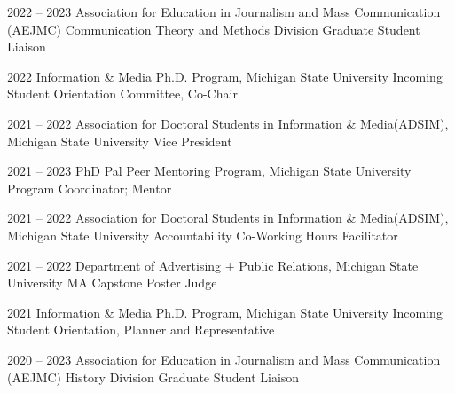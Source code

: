 \newpage
{}
\begin{cvskills}
    \cvskill
    {2022 -- 2023} %
    {Association for Education in Journalism and Mass Communication (AEJMC) Communication Theory and Methods Division} %
    {Graduate Student Liaison } %

    \cvskill        
    {2022} %
    {Information \& Media Ph.D. Program, Michigan State University} %
    {Incoming Student Orientation Committee, Co-Chair} %


    \cvskill
    {2021 -- 2022} %
    {Association for Doctoral Students in Information \& Media(ADSIM), Michigan State University } %
    {Vice President } %

    \cvskill
    {2021 -- 2023} %
    {PhD Pal Peer Mentoring Program, Michigan State University } %
    {Program Coordinator; Mentor} %
    
    \cvskill
    {2021 -- 2022} %
    {Association for Doctoral Students in Information \& Media(ADSIM), Michigan State University } %
    {Accountability Co-Working Hours Facilitator } %
    
    \cvskill
    {2021 -- 2022} %
    {Department of Advertising + Public Relations, Michigan State University } %
    {MA Capstone Poster Judge } %
    
    \cvskill
    {2021} %
    {Information \& Media Ph.D. Program, Michigan State University} %
    {Incoming Student Orientation, Planner and Representative } %

    \cvskill
    {2020 -- 2023} %
    {Association for Education in Journalism and Mass Communication (AEJMC) History Division} %
    {Graduate Student Liaison } %


\end{cvskills}

